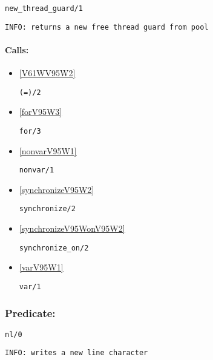 \begin{verbatim}
new_thread_guard/1
\end{verbatim}

{\small \begin{verbatim}
INFO: returns a new free thread guard from pool

\end{verbatim}}
\paragraph{Calls:} 
\begin{itemize}
\item \ref{V61WV95W2} 
\begin{verbatim}
(=)/2
\end{verbatim}

\item \ref{forV95W3} 
\begin{verbatim}
for/3
\end{verbatim}

\item \ref{nonvarV95W1} 
\begin{verbatim}
nonvar/1
\end{verbatim}

\item \ref{synchronizeV95W2} 
\begin{verbatim}
synchronize/2
\end{verbatim}

\item \ref{synchronizeV95WonV95W2} 
\begin{verbatim}
synchronize_on/2
\end{verbatim}

\item \ref{varV95W1} 
\begin{verbatim}
var/1
\end{verbatim}

\end{itemize}

\subsubsection{Predicate:} \label{nlV95W0}

\begin{verbatim}
nl/0
\end{verbatim}

{\small \begin{verbatim}
INFO: writes a new line character

\end{verbatim}}

